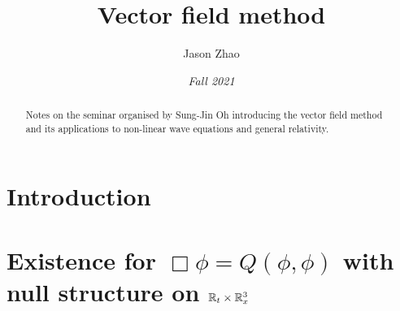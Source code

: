 \documentclass[10pt, reqno]{amsart}
\title
{
	Vector field method
}
\author{Jason Zhao}
\date{\emph{Fall 2021}}
\begin{document}
\maketitle

\begin{abstract}
	Notes on the seminar organised by Sung-Jin Oh introducing the vector field method and its applications to non-linear wave equations and general relativity. 
\end{abstract}

\tableofcontents

\section{Introduction}


\section{Existence for $\Box \phi = Q(\phi, \phi)$ with null structure on $\mathbb R_t \times \mathbb R^3_x$}




 
\end{document}
